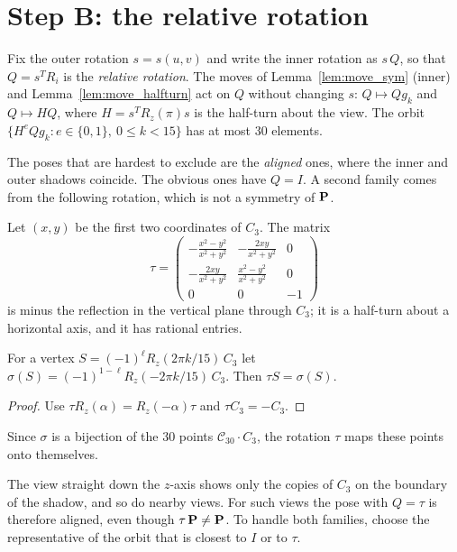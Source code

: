 \section{Step B: the relative rotation}

Fix the outer rotation $s = s(u, v)$ and write the inner rotation as $s\,Q$, so that
$Q = s^T R_i$ is the \emph{relative rotation}. The moves of Lemma~\ref{lem:move_sym}
(inner) and Lemma~\ref{lem:move_halfturn} act on $Q$ without changing $s$:
$Q \mapsto Q g_k$ and $Q \mapsto H Q$, where $H = s^T R_z(\pi) s$ is the half-turn about
the view. The orbit $\{ H^e Q g_k : e \in \{0, 1\},\ 0 \le k < 15 \}$ has at most 30
elements.

The poses that are hardest to exclude are the \emph{aligned} ones, where the inner
and outer shadows coincide. The obvious ones have $Q = I$. A second family comes from the
following rotation, which is not a symmetry of $\operatorname{\mathbf{P}}$.

\begin{definition}
\label{def:tau}
\leanok
Let $(x, y)$ be the first two coordinates of $C_3$. The matrix
\[
  \tau = \begin{pmatrix}
    -\frac{x^2 - y^2}{x^2 + y^2} & -\frac{2xy}{x^2 + y^2} & 0 \\
    -\frac{2xy}{x^2 + y^2} & \frac{x^2 - y^2}{x^2 + y^2} & 0 \\
    0 & 0 & -1
  \end{pmatrix}
\]
is minus the reflection in the vertical plane through $C_3$; it is a half-turn about a
horizontal axis, and it has rational entries.
\end{definition}

\begin{lemma}
\label{lem:tau_pair}
\leanok
{}
For a vertex $S = (-1)^\ell R_z(2\pi k/15)\, C_3$ let
$\sigma(S) = (-1)^{1-\ell} R_z(-2\pi k/15)\, C_3$. Then $\tau S = \sigma(S)$.
\end{lemma}
\begin{proof}
\leanok
Use $\tau R_z(\alpha) = R_z(-\alpha) \tau$ and $\tau C_3 = -C_3$.
\end{proof}

Since $\sigma$ is a bijection of the 30 points $\mathcal{C}_{30} \cdot C_3$, the rotation
$\tau$ maps these points onto themselves.

The view straight down the $z$-axis shows only the copies of $C_3$ on the boundary of
the shadow, and so do nearby views. For such views the pose with $Q = \tau$ is
therefore aligned, even though $\tau \operatorname{\mathbf{P}} \ne \operatorname{\mathbf{P}}$. To handle both families, choose the
representative of the orbit that is closest to $I$ or to $\tau$.

